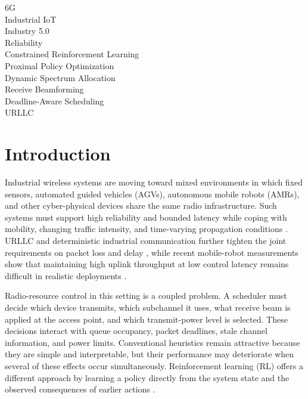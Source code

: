 \documentclass[number]{autarticle}
\begin{document}
\begin{frontmatter}
\begin{abstract}
\end{abstract}

\begin{keywords}
6G \\
Industrial IoT \\
Industry 5.0 \\
Reliability \\
Constrained Reinforcement Learning \\
Proximal Policy Optimization \\
Dynamic Spectrum Allocation \\
Receive Beamforming \\
Deadline-Aware Scheduling \\
URLLC
\end{keywords}

\end{frontmatter}

\section{Introduction}\label{introduction}
Industrial wireless systems are moving toward mixed environments in which fixed sensors, automated guided vehicles (AGVs), autonomous mobile robots (AMRs), and other cyber-physical devices share the same radio infrastructure. Such systems must support high reliability and bounded latency while coping with mobility, changing traffic intensity, and time-varying propagation conditions \cite{saad2020vision6g,letaief2019roadmap6g}. URLLC and deterministic industrial communication further tighten the joint requirements on packet loss and delay \cite{popovski2018urllc,sasiain2025tsn}, while recent mobile-robot measurements show that maintaining high uplink throughput at low control latency remains difficult in realistic deployments \cite{kornacki2025ugv}.

Radio-resource control in this setting is a coupled problem. A scheduler must decide which device transmits, which subchannel it uses, what receive beam is applied at the access point, and which transmit-power level is selected. These decisions interact with queue occupancy, packet deadlines, stale channel information, and power limits. Conventional heuristics remain attractive because they are simple and interpretable, but their performance may deteriorate when several of these effects occur simultaneously. Reinforcement learning (RL) offers a different approach by learning a policy directly from the system state and the observed consequences of earlier actions \cite{luong2019drlsurvey,zappone2019modelai}.
\end{document}
